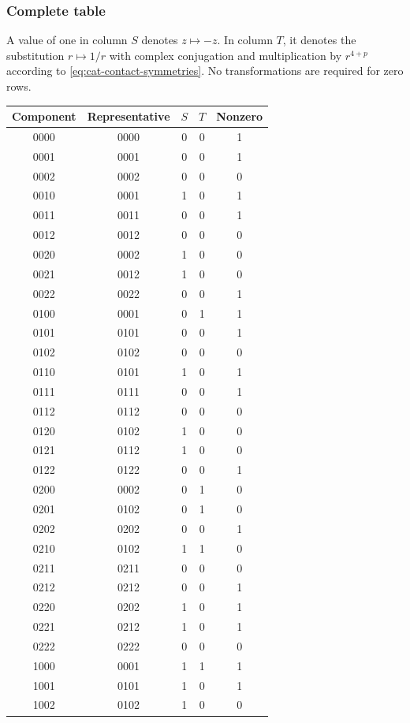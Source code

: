 \documentclass[11pt,a4paper]{article}
\begin{document}
\subsubsection{Complete table}
\label{sec:cat-component-table}
A value of one in column $S$ denotes $z\mapsto-z$. In column $T$, it denotes the substitution $r\mapsto1/r$ with complex conjugation and multiplication by $r^{4+p}$ according to \eqref{eq:cat-contact-symmetries}. No transformations are required for zero rows.
\begin{longtable}{ccccc}
Component & Representative & $S$ & $T$ & Nonzero\\\hline
0000 & 0000 & 0 & 0 & 1\\
0001 & 0001 & 0 & 0 & 1\\
0002 & 0002 & 0 & 0 & 0\\
0010 & 0001 & 1 & 0 & 1\\
0011 & 0011 & 0 & 0 & 1\\
0012 & 0012 & 0 & 0 & 0\\
0020 & 0002 & 1 & 0 & 0\\
0021 & 0012 & 1 & 0 & 0\\
0022 & 0022 & 0 & 0 & 1\\
0100 & 0001 & 0 & 1 & 1\\
0101 & 0101 & 0 & 0 & 1\\
0102 & 0102 & 0 & 0 & 0\\
0110 & 0101 & 1 & 0 & 1\\
0111 & 0111 & 0 & 0 & 1\\
0112 & 0112 & 0 & 0 & 0\\
0120 & 0102 & 1 & 0 & 0\\
0121 & 0112 & 1 & 0 & 0\\
0122 & 0122 & 0 & 0 & 1\\
0200 & 0002 & 0 & 1 & 0\\
0201 & 0102 & 0 & 1 & 0\\
0202 & 0202 & 0 & 0 & 1\\
0210 & 0102 & 1 & 1 & 0\\
0211 & 0211 & 0 & 0 & 0\\
0212 & 0212 & 0 & 0 & 1\\
0220 & 0202 & 1 & 0 & 1\\
0221 & 0212 & 1 & 0 & 1\\
0222 & 0222 & 0 & 0 & 0\\
1000 & 0001 & 1 & 1 & 1\\
1001 & 0101 & 1 & 0 & 1\\
1002 & 0102 & 1 & 0 & 0\\

\end{longtable}
\end{document}
